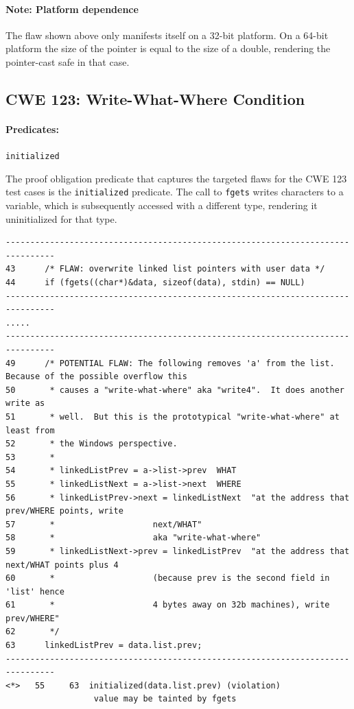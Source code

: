 \documentclass[11pt]{article}
\begin{document}
\paragraph{Note: Platform dependence}
The flaw shown above only manifests itself on a  32-bit platform. On  a 64-bit
platform the size of the pointer is equal to the size of a double, rendering the
pointer-cast safe in that case.


\subsection{CWE 123: Write-What-Where Condition}

\paragraph{Predicates:} {\tt initialized}

The proof obligation predicate that captures the targeted flaws for the CWE 123 
test cases is the {\tt  initialized} predicate. The call to {\tt fgets} writes
characters to a variable, which is subsequently accessed with a different type,
rendering it uninitialized for that type.

\begin{tiny}
\begin{verbatim}
--------------------------------------------------------------------------------
43      /* FLAW: overwrite linked list pointers with user data */
44      if (fgets((char*)&data, sizeof(data), stdin) == NULL)
--------------------------------------------------------------------------------
.....
--------------------------------------------------------------------------------
49      /* POTENTIAL FLAW: The following removes 'a' from the list.  Because of the possible overflow this
50       * causes a "write-what-where" aka "write4".  It does another write as
51       * well.  But this is the prototypical "write-what-where" at least from
52       * the Windows perspective.
53       *
54       * linkedListPrev = a->list->prev  WHAT
55       * linkedListNext = a->list->next  WHERE
56       * linkedListPrev->next = linkedListNext  "at the address that prev/WHERE points, write
57       *                    next/WHAT"
58       *                    aka "write-what-where"
59       * linkedListNext->prev = linkedListPrev  "at the address that next/WHAT points plus 4
60       *                    (because prev is the second field in 'list' hence
61       *                    4 bytes away on 32b machines), write prev/WHERE"
62       */
63      linkedListPrev = data.list.prev;
--------------------------------------------------------------------------------
<*>   55     63  initialized(data.list.prev) (violation)
                  value may be tainted by fgets
\end{verbatim}
\end{tiny}
\end{document}
